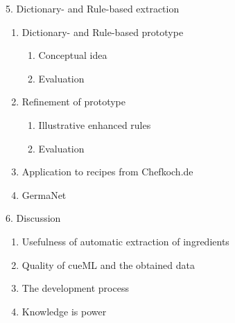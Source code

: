 \documentclass[12pt]{beamer}
\begin{document}
\begin{frame}{5. Dictionary- and Rule-based extraction}
	\begin{enumerate}
		\item Dictionary- and Rule-based prototype
		\begin{enumerate}
			\item Conceptual idea
			\item Evaluation
		\end{enumerate}
		\item Refinement of prototype
		\begin{enumerate}
			\item Illustrative enhanced rules
			\item Evaluation
		\end{enumerate}
		\item Application to recipes from Chefkoch.de
		\item GermaNet
	\end{enumerate}
\end{frame}

\begin{frame}{6. Discussion}
	\begin{enumerate}
		\item Usefulness of automatic extraction of ingredients
		\item Quality of cueML and the obtained data
		\item The development process
		\item Knowledge is power
	\end{enumerate}
\end{frame}
\end{document}
